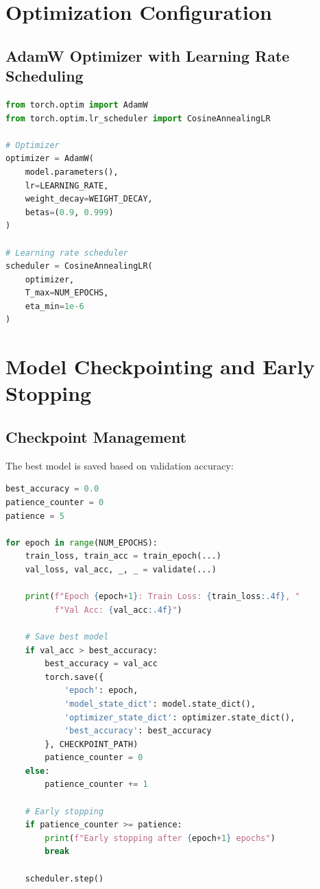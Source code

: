 \section{Optimization Configuration}

\subsection{AdamW Optimizer with Learning Rate Scheduling}

\begin{lstlisting}[language=Python, caption=Optimizer and Scheduler Setup]
from torch.optim import AdamW
from torch.optim.lr_scheduler import CosineAnnealingLR

# Optimizer
optimizer = AdamW(
    model.parameters(),
    lr=LEARNING_RATE,
    weight_decay=WEIGHT_DECAY,
    betas=(0.9, 0.999)
)

# Learning rate scheduler
scheduler = CosineAnnealingLR(
    optimizer,
    T_max=NUM_EPOCHS,
    eta_min=1e-6
)
\end{lstlisting}

\section{Model Checkpointing and Early Stopping}

\subsection{Checkpoint Management}

The best model is saved based on validation accuracy:

\begin{lstlisting}[language=Python, caption=Checkpoint Management]
best_accuracy = 0.0
patience_counter = 0
patience = 5

for epoch in range(NUM_EPOCHS):
    train_loss, train_acc = train_epoch(...)
    val_loss, val_acc, _, _ = validate(...)
    
    print(f"Epoch {epoch+1}: Train Loss: {train_loss:.4f}, "
          f"Val Acc: {val_acc:.4f}")
    
    # Save best model
    if val_acc > best_accuracy:
        best_accuracy = val_acc
        torch.save({
            'epoch': epoch,
            'model_state_dict': model.state_dict(),
            'optimizer_state_dict': optimizer.state_dict(),
            'best_accuracy': best_accuracy
        }, CHECKPOINT_PATH)
        patience_counter = 0
    else:
        patience_counter += 1
    
    # Early stopping
    if patience_counter >= patience:
        print(f"Early stopping after {epoch+1} epochs")
        break
    
    scheduler.step()
\end{lstlisting}

